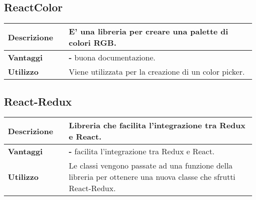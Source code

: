 \newpage
\vspace{40px}
\subsection{ReactColor}
\label{ReactColor}
\begin{table}[H]
	\centering
	\begin{tabular}{p{2cm}p{0.5cm}p{11.5cm}}
		\arrayrulecolor{lightgray}
		\toprule
		\textbf{Descrizione} & &
		E' una libreria \js{} per creare una palette di colori RGB.
		\\ \midrule
		\textbf{Vantaggi} & &
		\textbf{- }buona documentazione.
		\\ \midrule
		\textbf{Utilizzo} & &
		Viene  utilizzata per la creazione di un color picker.
		\\ \bottomrule
	\end{tabular}
\end{table}



\vspace{40px}
\subsection{React-Redux}
\label{React-Redux}
\begin{table}[H]
	\centering
	\begin{tabular}{p{2cm}p{0.5cm}p{11.5cm}}
		\arrayrulecolor{lightgray}
		\toprule
		\textbf{Descrizione} & &
		Libreria che facilita l'integrazione tra Redux e React.
		\\ \midrule
		\textbf{Vantaggi} & &
		\textbf{- }facilita l'integrazione tra Redux e React.
		\\ \midrule
		\textbf{Utilizzo} & &
		Le classi \js{} vengono passate ad una funzione della libreria per ottenere una nuova classe che sfrutti React-Redux.
		\\ \bottomrule
	\end{tabular}
\end{table}



\vspace{40px}
